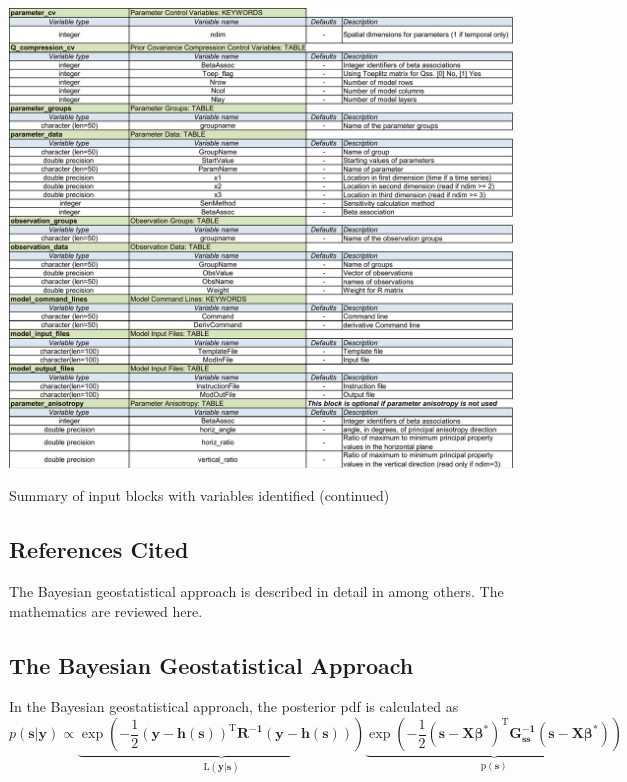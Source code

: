 \documentclass[11pt,oneside,onecolumn]{usgsreport}
\begin{document}
\begin{appendix}
\begin{bibunit}
\begin{table}[!t]
\begin{center}\includegraphics[scale=0.5]{Variables_for_documentation2}\end{center}

\caption{\label{tab:variables1-2}Summary of input blocks with variables identified (continued)}
\end{table}

\subsection{References Cited}
\putbib[GW]
\end{bibunit}
\begin{bibunit}

The Bayesian geostatistical approach is described in detail in \citet{KitanidisVomvoris1983,HoeksemaKitanidis1984a,Kitanidis1995,NowakCirpka2004}
among others. The mathematics are reviewed here.


\subsection{The Bayesian Geostatistical Approach}

In the Bayesian geostatistical approach, the posterior pdf is calculated
as 
\begin{equation}
p(\mathbf{s|y})\propto\mathrm{\underbrace{\exp\left(\mathbf{-}\frac{1}{2}\left(\mathbf{y-h}(\mathbf{s})\right)^{T}\mathbf{R^{-1}\left(\mathbf{y-h}(\mathbf{s})\right)}\right)}_{L\left(\mathbf{y}|\mathbf{s}\right)}\underbrace{\exp\left(\mathbf{-}\frac{1}{2}(\mathbf{s-X\beta}^{*})^{T}\mathbf{G_{\mathbf{ss}}^{-1}}(\mathbf{s-X\beta^{*}})\right)}_{p\left(\mathbf{s}\right)}}\label{eq:BGA}
\end{equation}


\end{bibunit}
\end{appendix}
\end{document}
